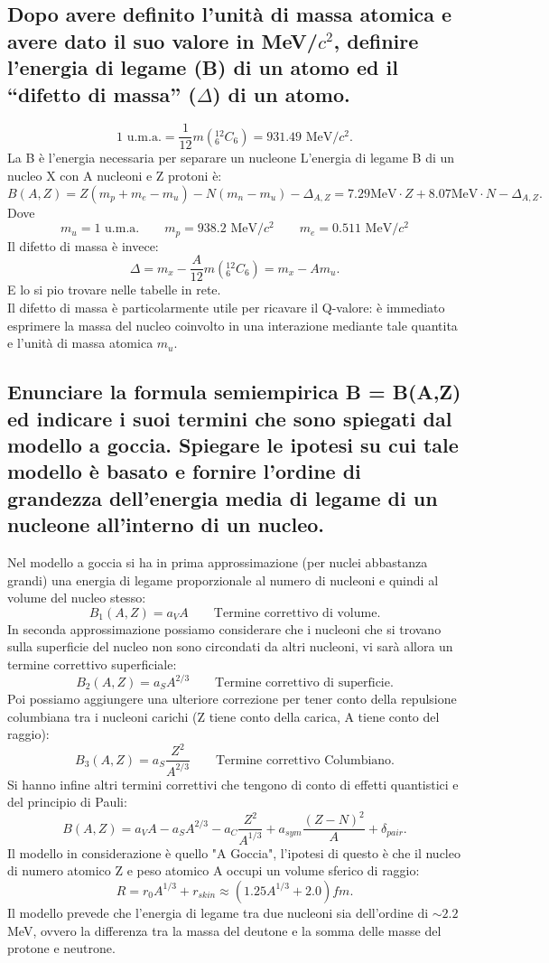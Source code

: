 \subsection[]{ Dopo avere definito l’unità di massa atomica e avere dato il suo valore in MeV/$c^2$, definire l’energia di legame (B) di un atomo ed il “difetto di massa” ($\Delta$) di un atomo.}
\[
	\text{1 u.m.a.} = \frac{1}{12}m\left( {}^{12}_{6}C_{6} \right) = 931.49 \text{ MeV/}c^2 
.\]
La B è l'energia necessaria per separare un nucleone 
L'energia di legame B di un nucleo X con A nucleoni e Z protoni è:
\[
	B\left( A, Z \right) = Z\left( m_p + m_e - m_u \right) - N \left( m_n - m_u \right) - \Delta_{A, Z} = 7.29 \text{MeV} \cdot Z + 8.07 \text{MeV} \cdot N - \Delta_{A,Z} 
.\] 
Dove 
\[
	m_u = 1 \text{ u.m.a.}\quad \quad 
	m_p = 938.2 \text{ MeV/}c^2\quad \quad 
	m_e = 0.511 \text{ MeV/}c^2
\]
Il difetto di massa è invece:
\[
	\Delta = m_{x} - \frac{A}{12}m\left( {}^{12}_{6}C_{6} \right) = m_x - Am_u 
.\] 
E lo si pio trovare nelle tabelle in rete.\\
Il difetto di massa è particolarmente utile per ricavare il Q-valore: è immediato esprimere la massa del nucleo coinvolto in una interazione mediante tale quantita e l'unità di massa atomica $m_u$.

\subsection[]{ Enunciare la formula semiempirica B = B(A,Z) ed indicare i suoi termini che sono spiegati dal modello a goccia. Spiegare le ipotesi su cui tale modello è basato e
fornire l'ordine di grandezza dell’energia media di legame di un nucleone all’interno di un nucleo.}
Nel modello a goccia si ha in prima approssimazione (per nuclei abbastanza grandi) una energia di legame proporzionale al numero di nucleoni e quindi al volume del nucleo stesso:
\[
	B_1\left( A, Z \right) = a_V A \quad \quad \text{Termine correttivo di volume}
.\] 
In seconda approssimazione possiamo considerare che i nucleoni che si trovano sulla superficie del nucleo non sono circondati da altri nucleoni, vi sarà allora un termine correttivo superficiale:
\[
	B_2\left( A,Z \right) = a_S A^{2/3} \quad \quad \text{Termine correttivo di superficie} 
.\] 
Poi possiamo aggiungere una ulteriore correzione per tener conto della repulsione columbiana tra i nucleoni carichi (Z tiene conto della carica, A tiene conto del raggio):
\[
	B_3\left( A,Z \right) = a_S \frac{Z^2}{A^{2/3}} \quad \quad \text{Termine correttivo Columbiano}
.\] 
Si hanno infine altri termini correttivi che tengono di conto di effetti quantistici e del principio di Pauli:
\[
	B\left( A,Z \right) = a_{V}A - a_{S}A^{2/3} - a_{C} \frac{Z^2 }{A^{1/3}} + a_{sym}\frac{\left( Z - N \right)^2}{A} + \delta_{pair} 
.\] \label{eq:B-energy}
Il modello in considerazione è quello "A Goccia", l'ipotesi di questo è che il nucleo di numero atomico Z e peso atomico A occupi un volume sferico di raggio:
\[
	R = r_0 A^{1/3} + r_{skin} \approx \left( 1.25 A^{1/3} + 2.0  \right) fm
.\]
Il modello prevede che l'energia di legame tra due nucleoni sia dell'ordine di $\sim 2.2$ MeV, ovvero la differenza tra la massa del deutone e la somma delle masse del protone e neutrone. 


